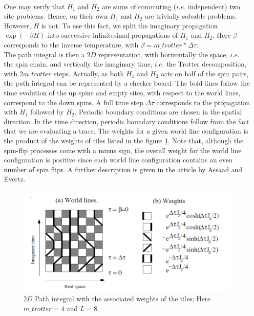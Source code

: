\documentclass[a4paper,12pt,twoside]{article}
\begin{document}
	\paragraph{} One may verify that $H_1$ and $H_2$ are sums of commuting ($i.e.$ independent) two site problems. Hence, on their own $H_1$ and $H_2$ are trivially solvable problems. However, $H$ is not. To use this fact, we split the imaginary propagation $\exp(-\beta H)$ into successive infinitesimal propagations of $H_1$ and $H_2$. Here $\beta$ corresponds
	to the inverse temperature, with $\beta = m\_trotter * \Delta \tau$.\\
	The path integral is then a $2D$ representation, with horizontally the space, $i.e.$ the spin chain, and vertically the imaginary time, $i.e.$ the Trotter decomposition, with $2 m\_trotter$ steps. Actually, as both $H_1$ and $H_2$ acts on half of the spin pairs, the path integral can be represented by a checker board. The bold lines follow the time evolution of the up	spins and empty sites, with respect to the world lines, correspond to the down spins. A full time step $\Delta \tau$ corresponds to the propagation with $H_1$ followed by	$H_2$. Periodic boundary conditions are chosen in the spatial direction. In the time direction, periodic boundary conditions follow from the fact that we are evaluating
	a trace. The weights for a given world line configuration is the product of the
	weights of tiles listed in the figure \ref{pathintegral}. Note that, although the spin-flip processes come with a minus sign, the overall weight for the world line configuration is positive since each world line configuration contains an even number of spin flips. A further description is given in the article by Assaad and Evertz. 
	
	\begin{figure}[!h]
		\centering
		\includegraphics[width=12cm]{pathintegral.png}
		\caption{$2D$ Path integral with the associated weights of the tiles; Here $m\_trotter = 4$ and $L=8$}
		\label{pathintegral}
	\end{figure}
	
\end{document}
